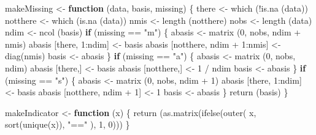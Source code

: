 \documentclass[
  12pt,
]{book}
\newenvironment{Shaded}{\begin{snugshade}}{\end{snugshade}}
\newcommand{\ControlFlowTok}[1]{\textcolor[rgb]{0.13,0.29,0.53}{\textbf{#1}}}
\newcommand{\DecValTok}[1]{\textcolor[rgb]{0.00,0.00,0.81}{#1}}
\newcommand{\FunctionTok}[1]{\textcolor[rgb]{0.00,0.00,0.00}{#1}}
\newcommand{\NormalTok}[1]{#1}
\newcommand{\OtherTok}[1]{\textcolor[rgb]{0.56,0.35,0.01}{#1}}
\newcommand{\SpecialCharTok}[1]{\textcolor[rgb]{0.00,0.00,0.00}{#1}}
\newcommand{\StringTok}[1]{\textcolor[rgb]{0.31,0.60,0.02}{#1}}
\begin{document}
\begin{Shaded}
\begin{Highlighting}[]
\NormalTok{makeMissing }\OtherTok{\textless{}{-}} \ControlFlowTok{function}\NormalTok{ (data, basis, missing) \{}
\NormalTok{  there }\OtherTok{\textless{}{-}} \FunctionTok{which}\NormalTok{ (}\SpecialCharTok{!}\FunctionTok{is.na}\NormalTok{ (data))}
\NormalTok{  notthere }\OtherTok{\textless{}{-}} \FunctionTok{which}\NormalTok{ (}\FunctionTok{is.na}\NormalTok{ (data))}
\NormalTok{  nmis }\OtherTok{\textless{}{-}} \FunctionTok{length}\NormalTok{ (notthere)}
\NormalTok{  nobs }\OtherTok{\textless{}{-}} \FunctionTok{length}\NormalTok{ (data)}
\NormalTok{  ndim }\OtherTok{\textless{}{-}} \FunctionTok{ncol}\NormalTok{ (basis)}
  \ControlFlowTok{if}\NormalTok{ (missing }\SpecialCharTok{==} \StringTok{"m"}\NormalTok{) \{}
\NormalTok{    abasis }\OtherTok{\textless{}{-}} \FunctionTok{matrix}\NormalTok{ (}\DecValTok{0}\NormalTok{, nobs, ndim }\SpecialCharTok{+}\NormalTok{ nmis)}
\NormalTok{    abasis [there, }\DecValTok{1}\SpecialCharTok{:}\NormalTok{ndim] }\OtherTok{\textless{}{-}}\NormalTok{ basis}
\NormalTok{    abasis [notthere, ndim }\SpecialCharTok{+} \DecValTok{1}\SpecialCharTok{:}\NormalTok{nmis] }\OtherTok{\textless{}{-}} \FunctionTok{diag}\NormalTok{(nmis)}
\NormalTok{    basis }\OtherTok{\textless{}{-}}\NormalTok{ abasis}
\NormalTok{  \}}
  \ControlFlowTok{if}\NormalTok{ (missing }\SpecialCharTok{==} \StringTok{"a"}\NormalTok{) \{}
\NormalTok{    abasis }\OtherTok{\textless{}{-}} \FunctionTok{matrix}\NormalTok{ (}\DecValTok{0}\NormalTok{, nobs, ndim)}
\NormalTok{    abasis [there,] }\OtherTok{\textless{}{-}}\NormalTok{ basis}
\NormalTok{    abasis [notthere,] }\OtherTok{\textless{}{-}} \DecValTok{1} \SpecialCharTok{/}\NormalTok{ ndim}
\NormalTok{    basis }\OtherTok{\textless{}{-}}\NormalTok{ abasis}
\NormalTok{  \}}
  \ControlFlowTok{if}\NormalTok{ (missing }\SpecialCharTok{==} \StringTok{"s"}\NormalTok{) \{}
\NormalTok{    abasis }\OtherTok{\textless{}{-}} \FunctionTok{matrix}\NormalTok{ (}\DecValTok{0}\NormalTok{, nobs, ndim }\SpecialCharTok{+} \DecValTok{1}\NormalTok{)}
\NormalTok{    abasis [there, }\DecValTok{1}\SpecialCharTok{:}\NormalTok{ndim] }\OtherTok{\textless{}{-}}\NormalTok{ basis}
\NormalTok{    abasis [notthere, ndim }\SpecialCharTok{+} \DecValTok{1}\NormalTok{] }\OtherTok{\textless{}{-}} \DecValTok{1}
\NormalTok{    basis }\OtherTok{\textless{}{-}}\NormalTok{ abasis}
\NormalTok{  \}}
  \FunctionTok{return}\NormalTok{ (basis)}
\NormalTok{\}}

\NormalTok{makeIndicator }\OtherTok{\textless{}{-}} \ControlFlowTok{function}\NormalTok{ (x) \{}
  \FunctionTok{return}\NormalTok{ (}\FunctionTok{as.matrix}\NormalTok{(}\FunctionTok{ifelse}\NormalTok{(}\FunctionTok{outer}\NormalTok{(}
\NormalTok{    x, }\FunctionTok{sort}\NormalTok{(}\FunctionTok{unique}\NormalTok{(x)), }\StringTok{"=="}
\NormalTok{  ), }\DecValTok{1}\NormalTok{, }\DecValTok{0}\NormalTok{)))}
\NormalTok{\}}


\end{Highlighting}
\end{Shaded}
\end{document}
